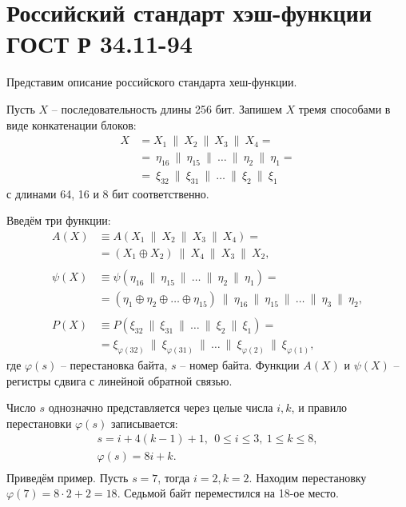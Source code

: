 \section{Российский стандарт хэш-функции ГОСТ Р 34.11-94}

Представим описание российского стандарта хеш-функции.

Пусть $X$ -- последовательность длины 256 бит. Запишем $X$ тремя способами в виде конкатенации блоков:
\[ \begin{array}{ll}
    X & = X_1 ~\|~ X_2 ~\|~ X_3 ~\|~ X_4 = \\
    & = ~ \eta_{16} ~\|~ \eta_{15} ~\|~ \dots ~\|~ \eta_2 ~\|~ \eta_1 = \\
    & = ~ \xi_{32} ~\|~ \xi_{31} ~\|~ \dots ~\|~ \xi_2 ~\|~ \xi_1
\end{array} \]
с длинами 64, 16 и 8 бит соответственно.

Введём три функции:
\[ \begin{array}{ll}
    A(X) & \equiv A(X_1 ~\|~ X_2 ~\|~ X_3 ~\|~ X_4) = \\
        & = \left( X_1 \oplus X_2 \right) ~\|~ X_4 ~\|~ X_3 ~\|~ X_2, \\
    & \\
    \psi(X) & \equiv \psi(\eta_{16} ~\|~ \eta_{15} ~\|~ \dots ~\|~ \eta_2 ~\|~ \eta_1) = \\
        & = \left( \eta_1 \oplus \eta_2 \oplus \dots \oplus \eta_{15} \right) ~\|~
            \eta_{16} ~\|~ \eta_{15} ~\|~ \dots ~\|~ \eta_3 ~\|~ \eta_2, \\
    & \\
    P(X) & \equiv P(\xi_{32} ~\|~ \xi_{31} ~\|~ \dots ~\|~ \xi_2 ~\|~ \xi_1) = \\
        & = \xi_{\varphi(32)} ~\|~ \xi_{\varphi(31)} ~\|~ \dots ~\|~ \xi_{\varphi(2)} ~\|~ \xi_{\varphi(1)},
\end{array} \]
где $\varphi(s)$ -- перестановка байта, $s$ -- номер байта. Функции $A(X)$ и $\psi(X)$ -- регистры сдвига с линейной обратной связью.

Число $s$ однозначно представляется через целые числа $i,k$, и правило перестановки $\varphi(s)$ записывается:
\[ \begin{array}{c}
    s = i + 4 (k - 1) + 1, ~~ 0 \le i \le 3, ~ 1 \le k \le 8, \\
    \varphi(s) = 8 i + k. \\
\end{array} \]
Приведём пример. Пусть $s = 7$, тогда $i=2, k=2$. Находим перестановку $\varphi(7) = 8 \cdot 2 + 2 = 18$. Седьмой байт переместился на 18-ое место.

